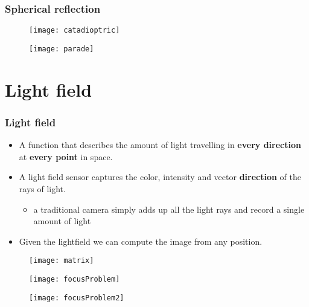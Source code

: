 \begin{frame}
\frametitle{Spherical reflection}
\begin{figure}[!h]
\centering
\texttt{[image: catadioptric]}
\end{figure}
\end{frame}

\begin{frame}
\begin{figure}[!h]
\centering
\texttt{[image: parade]}
\end{figure}
\end{frame}

\section{Light field}

\begin{frame}
\frametitle{Light field}
\begin{itemize}
\item A function that describes the amount of light travelling in \textbf{every direction} at \textbf{every point} in space.
\item A light field sensor captures the color, intensity and vector \textbf{direction} of the rays of light.
\begin{itemize}
\item a traditional camera simply adds up all the light rays and record a single amount of light
\end{itemize}
\item Given the lightfield we can compute the image from any position.
\end{itemize}
\end{frame}

\begin{frame}
\begin{figure}[!h]
\centering
\texttt{[image: matrix]}
\end{figure}
\end{frame}

\begin{frame}
\begin{figure}[!h]
\centering
\texttt{[image: focusProblem]}
\end{figure}
\end{frame}

\begin{frame}
\begin{figure}[!h]
\centering
\texttt{[image: focusProblem2]}
\end{figure}
\end{frame}

